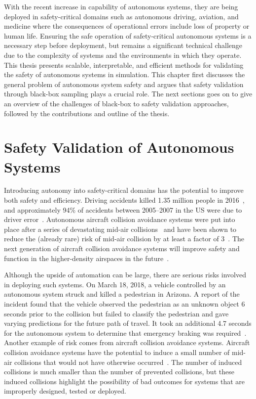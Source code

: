 With the recent increase in capability of autonomous systems, they are being deployed in safety-critical domains such as autonomous driving, aviation, and medicine where the consequences of operational errors include loss of property or human life. Ensuring the safe operation of safety-critical autonomous systems is a necessary step before deployment, but remains a significant technical challenge due to the complexity of systems and the environments in which they operate. This thesis presents scalable, interpretable, and efficient methods for validating the safety of autonomous systems in simulation. This chapter first discusses the general problem of autonomous system safety and argues that safety validation through black-box sampling plays a crucial role. The next sections goes on to give an overview of the challenges of black-box to safety validation approaches, followed by the contributions and outline of the thesis. 

\section{Safety Validation of Autonomous Systems}

Introducing autonomy into safety-critical domains has the potential to improve both safety and efficiency. Driving accidents killed \num{1.35} million people in 2016~\cite{world2019global}, and approximately \num{94}\% of accidents between 2005--2007 in the US were due to driver error~\cite{singh2015critical}. Autonomous aircraft collision avoidance systems were put into place after a series of devastating mid-air collisions~\cite{federal2011introduction} and have been shown to reduce the (already rare) risk of mid-air collision by at least a factor of 3~\cite{arino2002studies}. The next generation of aircraft collision avoidance systems will improve safety and function in the higher-density airspaces in the future~\cite{kochenderfer2012next}.

Although the upside of automation can be large, there are serious risks involved in deploying such systems. On March 18, 2018, a vehicle controlled by an autonomous system struck and killed a pedestrian in Arizona. A report of the incident found that the vehicle observed the pedestrian as an unknown object \num{6} seconds prior to the collision but failed to classify the pedestrian and gave varying predictions for the future path of travel. It took an additional \num{4.7} seconds for the autonomous system to determine that emergency braking was required~\cite{board2018preliminary}. Another example of risk comes from aircraft collision avoidance systems. Aircraft collision avoidance systems have the potential to induce a small number of mid-air collisions that would not have otherwise occurred~\cite{arino2002studies}. The number of induced collisions is much smaller than the number of prevented collisions, but these induced collisions highlight the possibility of bad outcomes for systems that are improperly designed, tested or deployed.

